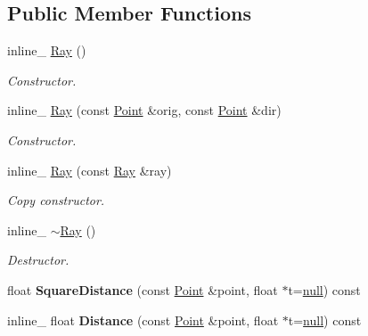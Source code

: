 \subsection*{Public Member Functions}
\begin{DoxyCompactItemize}
\item 
inline\+\_\+ \hyperlink{classRay_aad41f50d3c33b8d43d5d6bb364d7b44f}{Ray} ()\hypertarget{classRay_aad41f50d3c33b8d43d5d6bb364d7b44f}{}\label{classRay_aad41f50d3c33b8d43d5d6bb364d7b44f}

\begin{DoxyCompactList}\small\item\em Constructor. \end{DoxyCompactList}\item 
inline\+\_\+ \hyperlink{classRay_ad54775e1b3e5497684e90f6fa4c77d1b}{Ray} (const \hyperlink{classPoint}{Point} \&orig, const \hyperlink{classPoint}{Point} \&dir)\hypertarget{classRay_ad54775e1b3e5497684e90f6fa4c77d1b}{}\label{classRay_ad54775e1b3e5497684e90f6fa4c77d1b}

\begin{DoxyCompactList}\small\item\em Constructor. \end{DoxyCompactList}\item 
inline\+\_\+ \hyperlink{classRay_a057ae4c83faa2d07daca87d80f368485}{Ray} (const \hyperlink{classRay}{Ray} \&ray)\hypertarget{classRay_a057ae4c83faa2d07daca87d80f368485}{}\label{classRay_a057ae4c83faa2d07daca87d80f368485}

\begin{DoxyCompactList}\small\item\em Copy constructor. \end{DoxyCompactList}\item 
inline\+\_\+ \hyperlink{classRay_a1cdd7df15786c6c537839053c4b9407c}{$\sim$\+Ray} ()\hypertarget{classRay_a1cdd7df15786c6c537839053c4b9407c}{}\label{classRay_a1cdd7df15786c6c537839053c4b9407c}

\begin{DoxyCompactList}\small\item\em Destructor. \end{DoxyCompactList}\item 
float {\bfseries Square\+Distance} (const \hyperlink{classPoint}{Point} \&point, float $\ast$t=\hyperlink{IceTypes_8h_ac97b8ee753e4405397a42ad5799b0f9e}{null}) const \hypertarget{classRay_af768696653b687f4ec0d23f5973fba39}{}\label{classRay_af768696653b687f4ec0d23f5973fba39}

\item 
inline\+\_\+ float {\bfseries Distance} (const \hyperlink{classPoint}{Point} \&point, float $\ast$t=\hyperlink{IceTypes_8h_ac97b8ee753e4405397a42ad5799b0f9e}{null}) const \hypertarget{classRay_af5e5523d4880544f197cb08bcde3e96e}{}\label{classRay_af5e5523d4880544f197cb08bcde3e96e}

\end{DoxyCompactItemize}
